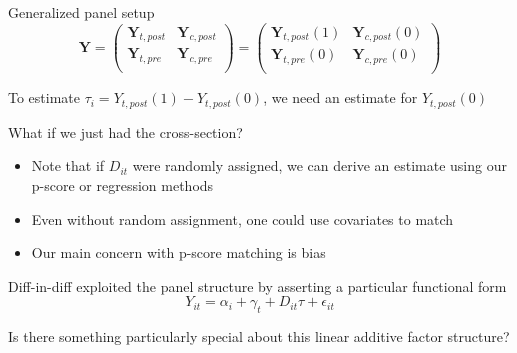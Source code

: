 \documentclass[notes,11pt, aspectratio=169]{beamer}
\newenvironment{wideitemize}{\itemize\addtolength{\itemsep}{10pt}}{\enditemize}
\begin{document}
\begin{frame}{Generalized panel setup}
      \begin{equation*}
        \mathbf{Y} = \left( \begin{array}{cc}
                              \mathbf{Y}_{t,post} & \mathbf{Y}_{c,post} \\
                              \mathbf{Y}_{t,pre} & \mathbf{Y}_{c,pre} \\
                            \end{array}
                            \right) =  \left( \begin{array}{cc}
                              \mathbf{Y}_{t,post}(1) & \mathbf{Y}_{c,post}(0) \\
                              \mathbf{Y}_{t,pre}(0) & \mathbf{Y}_{c,pre}(0) \\
                            \end{array}
                            \right)
      \end{equation*}
      \begin{wideitemize}
      \item To estimate $\tau_{i} = Y_{t,post}(1) - Y_{t,post}(0)$, we
        need an estimate for $Y_{t,post}(0)$
      \item What if we just had the cross-section?
        \begin{itemize}
        \item Note that if $D_{it}$ were randomly assigned, we can
          derive an estimate using our p-score or regression methods
        \item Even without random assignment, one could use covariates
          to match
        \item Our main concern with p-score matching is bias
        \end{itemize}
      \item Diff-in-diff exploited the panel structure by asserting a particular functional form
        \begin{equation*}
          Y_{it} = \alpha_{i} + \gamma_{t} + D_{it}\tau + \epsilon_{it}
        \end{equation*}
      \item Is there something particularly special about this linear
        additive factor structure?
      \end{wideitemize}
\end{frame}
\end{document}
